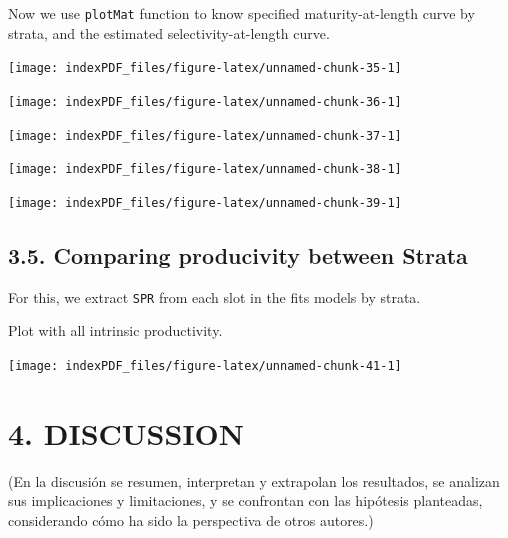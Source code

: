 \documentclass[
]{article}
\begin{document}
Now we use \texttt{plotMat} function to know specified
maturity-at-length curve by strata, and the estimated
selectivity-at-length curve.

\begin{center}\texttt{[image: indexPDF\_files/figure-latex/unnamed-chunk-35-1]} \end{center}

\begin{center}\texttt{[image: indexPDF\_files/figure-latex/unnamed-chunk-36-1]} \end{center}

\begin{center}\texttt{[image: indexPDF\_files/figure-latex/unnamed-chunk-37-1]} \end{center}

\begin{center}\texttt{[image: indexPDF\_files/figure-latex/unnamed-chunk-38-1]} \end{center}

\begin{center}\texttt{[image: indexPDF\_files/figure-latex/unnamed-chunk-39-1]} \end{center}

\hypertarget{comparing-producivity-between-strata}{%
\subsection{3.5. Comparing producivity between
Strata}\label{comparing-producivity-between-strata}}

For this, we extract \texttt{SPR} from each slot in the fits models by
strata.

Plot with all intrinsic productivity.

\begin{center}\texttt{[image: indexPDF\_files/figure-latex/unnamed-chunk-41-1]} \end{center}

\newpage

\hypertarget{discussion}{%
\section{4. DISCUSSION}\label{discussion}}

(En la discusión se resumen, interpretan y extrapolan los resultados, se
analizan sus implicaciones y limitaciones, y se confrontan con las
hipótesis planteadas, considerando cómo ha sido la perspectiva de otros
autores.)
\end{document}
